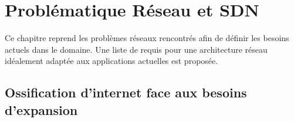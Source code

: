 \chapter{Problématique Réseau et SDN}
\label{chap-1}



Ce chapitre reprend les problèmes réseaux rencontrés afin de définir les besoins actuels dans le domaine. 
Une liste de requis pour une architecture réseau idéalement adaptée aux applications actuelles est proposée.


\section{Ossification d'internet face aux besoins d'expansion}







